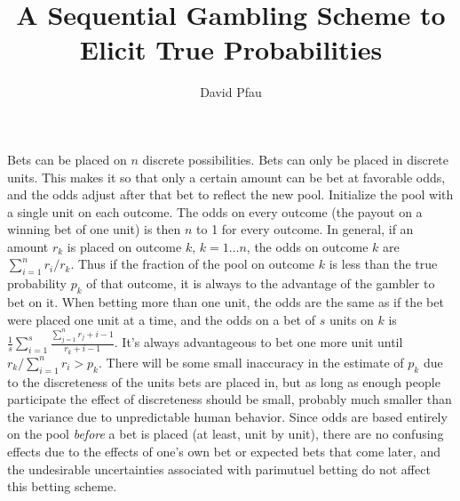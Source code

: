 \documentclass[11pt]{article}
\title{A Sequential Gambling Scheme to Elicit True Probabilities}
\author{David Pfau}
\begin{document}
\maketitle

Bets can be placed on $n$ discrete possibilities.  Bets can only be placed in discrete units.  This makes it so that only a certain amount can be bet at favorable odds, and the odds adjust after that bet to reflect the new pool.  Initialize the pool with a single unit on each outcome.  The odds on every outcome (the payout on a winning bet of one unit) is then $n$ to 1 for every outcome.  In general, if an amount $r_k$ is placed on outcome $k,\,k=1 \ldots n$, the odds on outcome $k$ are $\sum_{i=1}^n r_i / r_k$.  Thus if the fraction of the pool on outcome $k$ is less than the true probability $p_k$ of that outcome, it is always to the advantage of the gambler to bet on it.  When betting more than one unit, the odds are the same as if the bet were placed one unit at a time, and the odds on a bet of $s$ units on $k$ is $\frac{1}{s}\sum_{i=1}^s \frac{\sum_{j=1}^n r_j + i - 1}{r_k + i - 1}$.  It's always advantageous to bet one more unit until $r_k/\sum_{i=1}^n r_i > p_k$.  There will be some small inaccuracy in the estimate of $p_k$ due to the discreteness of the units bets are placed in, but as long as enough people participate the effect of discreteness should be small, probably much smaller than the variance due to unpredictable human behavior.  Since odds are based entirely on the pool {\em before} a bet is placed (at least, unit by unit), there are no confusing effects due to the effects of one's own bet or expected bets that come later, and the undesirable uncertainties associated with parimutuel betting do not affect this betting scheme.
\end{document}
